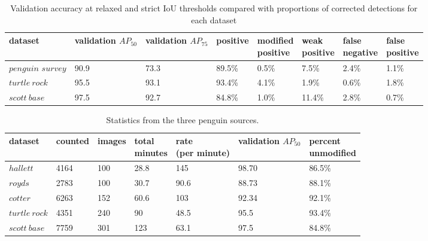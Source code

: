 \begin{table}[th!]
\caption{Validation accuracy at relaxed and strict IoU thresholds compared with proportions of corrected detections for each dataset}
\label{tab:validation_corrections}
\begin{tabular}{llllllll}
dataset           & \shortstack{validation \\ $AP_{50}$} & \shortstack{validation  \\ $AP_{75}$} & positive & \shortstack{modified\\ positive} & \shortstack{weak\\ positive} & \shortstack{false \\ negative} & \shortstack{false \\ positive} \\
\toprule
\shortstack {$penguin$ \\ $survey$} & 90.9      & 73.3      & 89.5\%   & 0.5\%             & 7.5\%         & 2.4\%          & 1.1\%        \\ 
$turtle\:rock$           & 95.5      & 93.1      & 93.4\%   & 4.1\%             & 1.9\%         & 0.6\%          & 1.8\%          \\
$scott\:base$     & 97.5      & 92.7      & 84.8\%   & 1.0\%             & 11.4\%        & 2.8\%          & 0.7\%          \\
\bottomrule
\end{tabular}
\end{table}


\begin{table}[ht!]
  \centering
    \caption{Statistics from the three penguin sources. }
\begin{tabular}{lllllll}
dataset &  counted & images & \shortstack{total  \\ minutes} & \shortstack{rate \\ (per minute)} & \shortstack {validation \\  $AP_{50}$} & \shortstack{percent \\ unmodified} \\
\toprule
$hallett$   & 4164   & 100 & 28.8          & 145               & 98.70     & 86.5\%   \\
$royds$     & 2783   &  100  & 30.7          & 90.6              & 88.73     & 88.1\%   \\
$cotter$    & 6263   & 152 & 60.6          & 103               & 92.34     & 92.1\%   \\
\midrule
$turtle\:rock$ & 4351  & 240    & 90          & 48.5               & 95.5     & 93.4\%   \\
$scott\:base$  & 7759   & 301    & 123          & 63.1              & 97.5    & 84.8\%   \\
\bottomrule
\end{tabular}

\label{tab:penguin_statistics}
\end{table}